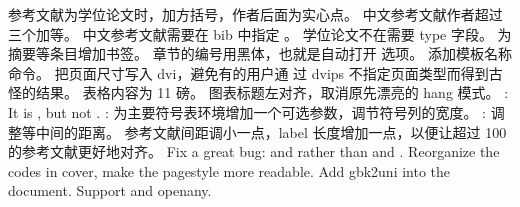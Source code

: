 \markdownRendererUlItem 参考文献为学位论文时，加方括号，作者后面为实心点。\markdownRendererUlItemEnd 
\markdownRendererUlItem 中文参考文献作者超过三个加等。\markdownRendererUlItemEnd 
\markdownRendererUlItem 中文参考文献需要在 bib 中指定 。\markdownRendererUlItemEnd 
\markdownRendererUlItem 学位论文不在需要 type 字段。\markdownRendererUlItemEnd 
\markdownRendererUlItem 为摘要等条目增加书签。\markdownRendererUlItemEnd 
\markdownRendererUlItem 章节的编号用黑体，也就是自动打开  选项。\markdownRendererUlItemEnd 
\markdownRendererUlItem 添加模板名称命令。\markdownRendererUlItemEnd 
\markdownRendererUlItem 把页面尺寸写入 dvi，避免有的用户通 过 dvips 不指定页面类型而得到古怪的结果。\markdownRendererUlItemEnd 
\markdownRendererUlItem 表格内容为 11 磅。\markdownRendererUlItemEnd 
\markdownRendererUlItem 图表标题左对齐，取消原先漂亮的 hang 模式。\markdownRendererUlItemEnd 
\markdownRendererUlItem {}: It is , but not .\markdownRendererUlItemEnd 
\markdownRendererUlItem {}: 为主要符号表环境增加一个可选参数，调节符号列的宽度。\markdownRendererUlItemEnd 
\markdownRendererUlItem {}: 调整等中间的距离。\markdownRendererUlItemEnd 
\markdownRendererUlItem 参考文献间距调小一点，label 长度增加一点，以便让超过 100 的参考文献更好地对齐。\markdownRendererUlItemEnd 
\markdownRendererUlEnd \markdownRendererInterblockSeparator
{}\markdownRendererInterblockSeparator
{}\markdownRendererInterblockSeparator
{}\markdownRendererUlBegin
\markdownRendererUlItem Fix a great bug:  and  rather than  and .\markdownRendererUlItemEnd 
\markdownRendererUlItem Reorganize the codes in cover, make the pagestyle more readable.\markdownRendererUlItemEnd 
\markdownRendererUlItem Add gbk2uni into the document.\markdownRendererUlItemEnd 
\markdownRendererUlItem Support  and openany.\markdownRendererUlItemEnd 
